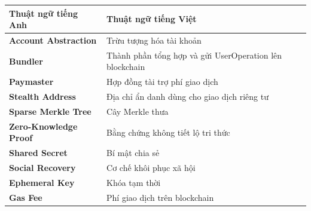 \documentclass[../DoAn.tex]{subfiles}
\begin{document}
\begin{longtable}{l p{14cm}}
	\hline
	\textbf{Thuật ngữ tiếng Anh} & \textbf{Thuật ngữ tiếng Việt} \\
	\hline
	
	\textbf{Account Abstraction} & Trừu tượng hóa tài khoản \\
	\textbf{Bundler} & Thành phần tổng hợp và gửi UserOperation lên blockchain \\
	\textbf{Paymaster} & Hợp đồng tài trợ phí giao dịch \\
	\textbf{Stealth Address} & Địa chỉ ẩn danh dùng cho giao dịch riêng tư \\
	\textbf{Sparse Merkle Tree} & Cây Merkle thưa \\
	\textbf{Zero-Knowledge Proof} & Bằng chứng không tiết lộ tri thức \\
	\textbf{Shared Secret} & Bí mật chia sẻ \\
	\textbf{Social Recovery} & Cơ chế khôi phục xã hội \\
	\textbf{Ephemeral Key} & Khóa tạm thời \\
	\textbf{Gas Fee} & Phí giao dịch trên blockchain \\
	
	\hline
\end{longtable}
\end{document}

